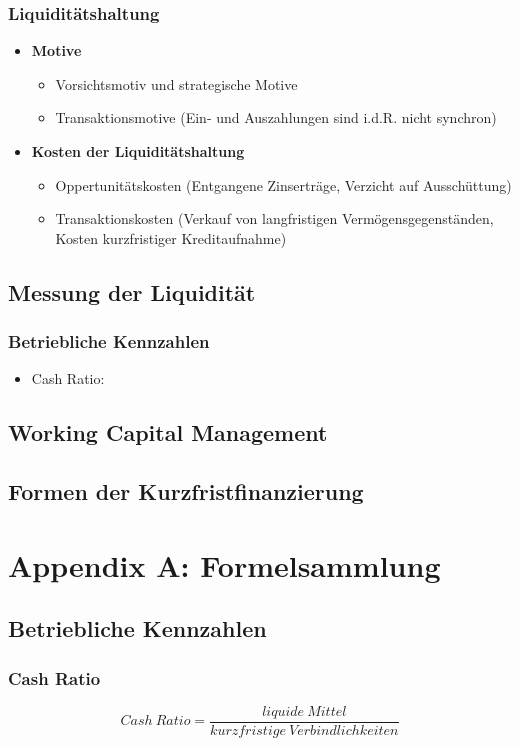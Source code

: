 \subsubsection{Liquiditätshaltung}
\begin{itemize}
	\item \textbf{Motive}
	\begin{itemize}
		\item Vorsichtsmotiv und strategische Motive
		\item Transaktionsmotive (Ein- und Auszahlungen sind i.d.R. nicht synchron)
	\end{itemize}
	\item \textbf{Kosten der Liquiditätshaltung}
	\begin{itemize}
		\item Oppertunitätskosten (Entgangene Zinserträge, Verzicht auf Ausschüttung)
		\item Transaktionskosten (Verkauf von langfristigen Vermögensgegenständen, Kosten kurzfristiger Kreditaufnahme)
	\end{itemize}
\end{itemize}


\subsection{Messung der Liquidität}

\subsubsection{Betriebliche Kennzahlen}
\begin{itemize}
	\item Cash Ratio:
\end{itemize}


\subsection{Working Capital Management}


\subsection{Formen der Kurzfristfinanzierung}




\section{Appendix A: Formelsammlung}

\subsection{Betriebliche Kennzahlen}

\subsubsection{Cash Ratio}
\[Cash~Ratio = \frac{liquide~Mittel}{kurzfristige~Verbindlichkeiten}\]
